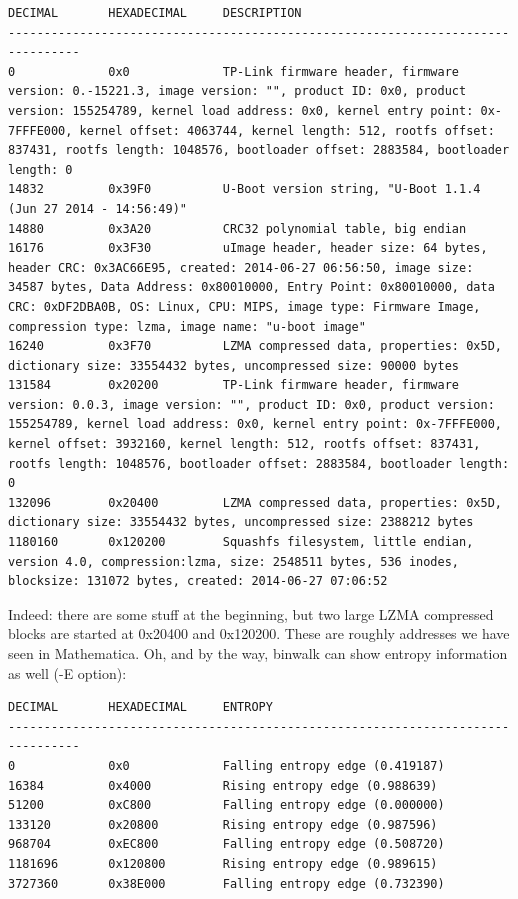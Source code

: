\begin{lstlisting}
DECIMAL       HEXADECIMAL     DESCRIPTION
--------------------------------------------------------------------------------
0             0x0             TP-Link firmware header, firmware version: 0.-15221.3, image version: "", product ID: 0x0, product version: 155254789, kernel load address: 0x0, kernel entry point: 0x-7FFFE000, kernel offset: 4063744, kernel length: 512, rootfs offset: 837431, rootfs length: 1048576, bootloader offset: 2883584, bootloader length: 0
14832         0x39F0          U-Boot version string, "U-Boot 1.1.4 (Jun 27 2014 - 14:56:49)"
14880         0x3A20          CRC32 polynomial table, big endian
16176         0x3F30          uImage header, header size: 64 bytes, header CRC: 0x3AC66E95, created: 2014-06-27 06:56:50, image size: 34587 bytes, Data Address: 0x80010000, Entry Point: 0x80010000, data CRC: 0xDF2DBA0B, OS: Linux, CPU: MIPS, image type: Firmware Image, compression type: lzma, image name: "u-boot image"
16240         0x3F70          LZMA compressed data, properties: 0x5D, dictionary size: 33554432 bytes, uncompressed size: 90000 bytes
131584        0x20200         TP-Link firmware header, firmware version: 0.0.3, image version: "", product ID: 0x0, product version: 155254789, kernel load address: 0x0, kernel entry point: 0x-7FFFE000, kernel offset: 3932160, kernel length: 512, rootfs offset: 837431, rootfs length: 1048576, bootloader offset: 2883584, bootloader length: 0
132096        0x20400         LZMA compressed data, properties: 0x5D, dictionary size: 33554432 bytes, uncompressed size: 2388212 bytes
1180160       0x120200        Squashfs filesystem, little endian, version 4.0, compression:lzma, size: 2548511 bytes, 536 inodes, blocksize: 131072 bytes, created: 2014-06-27 07:06:52
\end{lstlisting}

Indeed: there are some stuff at the beginning, but two large LZMA compressed blocks are started at 0x20400 and 0x120200.
These are roughly addresses we have seen in Mathematica.
Oh, and by the way, binwalk can show entropy information as well (-E option):

\begin{lstlisting}
DECIMAL       HEXADECIMAL     ENTROPY
--------------------------------------------------------------------------------
0             0x0             Falling entropy edge (0.419187)
16384         0x4000          Rising entropy edge (0.988639)
51200         0xC800          Falling entropy edge (0.000000)
133120        0x20800         Rising entropy edge (0.987596)
968704        0xEC800         Falling entropy edge (0.508720)
1181696       0x120800        Rising entropy edge (0.989615)
3727360       0x38E000        Falling entropy edge (0.732390)
\end{lstlisting}

